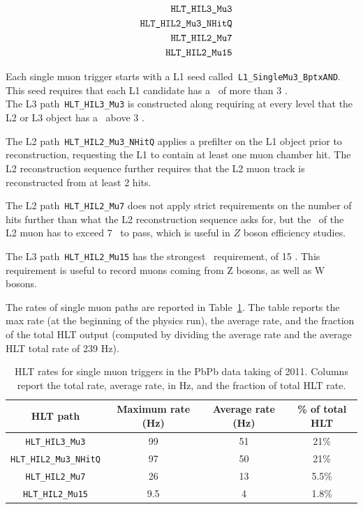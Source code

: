\begin{eqnarray*}
  & &\verb?HLT_HIL3_Mu3?\\
  & &\verb?HLT_HIL2_Mu3_NHitQ?\\
  & &\verb?HLT_HIL2_Mu7?\\
  & &\verb?HLT_HIL2_Mu15?\\
\end{eqnarray*}

Each single muon trigger starts with a L1 seed
called~\verb?L1_SingleMu3_BptxAND?. This seed requires that each L1
candidate has a \pt\ of more than 3 \GeVc. 
\\
The L3 path~\verb?HLT_HIL3_Mu3? is constructed along requiring at
every level that the L2 or L3 object has a \pt\ above 3 \GeVc.


The L2 path~\verb?HLT_HIL2_Mu3_NHitQ? applies a prefilter on the L1
object prior to reconstruction, requesting the L1 to contain at least
one muon chamber hit. The L2 reconstruction
sequence further requires that the L2 muon track is reconstructed from at least 2 hits.


The L2 path~\verb?HLT_HIL2_Mu7? does not apply strict requirements on
the number of hits further than what the L2 reconstruction sequence
asks for, but the \pt\ of the L2 muon has to exceed 7 \GeVc\ to pass,
which is useful in $Z$ boson efficiency studies.%


The L3 path~\verb?HLT_HIL2_Mu15? has the strongest \pt\ requirement, of
15 \GeVc. This requirement is useful to record muons coming from Z bosons, as well as W bosons.


The rates of single muon paths are reported in
Table~\ref{tab:murates2011}. The table reports the max rate
(at the beginning of the physics run), the average rate, and the
fraction of the total HLT output (computed by dividing the average
rate and the average HLT total rate of 239 Hz).

\begin{table}[h]
  \begin{center}
    \begin{tabular}{|c|c|c|c|}
      \hline
      HLT path & Maximum rate (Hz) & Average rate (Hz)& \% of total
      HLT\\
      \hline
      \hline
      \verb?HLT_HIL3_Mu3?& 99 & 51 & 21\%\\
      \verb?HLT_HIL2_Mu3_NHitQ?& 97 & 50 & 21\%\\
      \verb?HLT_HIL2_Mu7?& 26 & 13 & 5.5\%\\
      \verb?HLT_HIL2_Mu15?& 9.5 & 4 & 1.8\%\\
      \hline
    \end{tabular}
  \end{center}

  \caption{HLT rates for single muon triggers in the PbPb data taking of
    2011. Columns report the total rate, average rate, in Hz,
    and the fraction of total HLT rate.}
\label{tab:murates2011}
\end{table}



